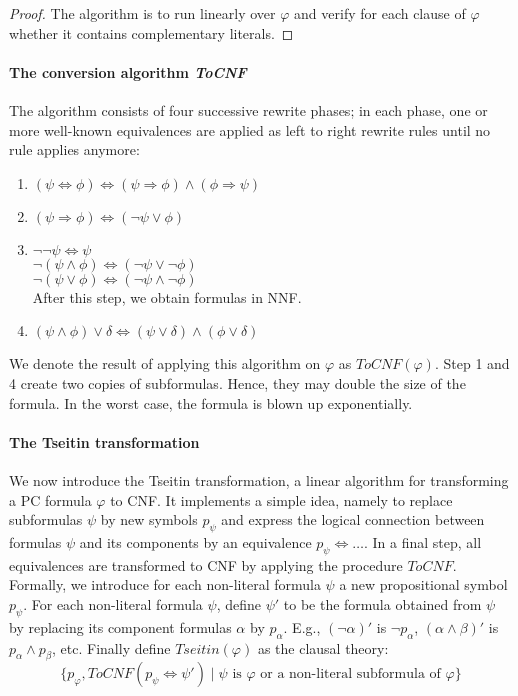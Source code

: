 \documentclass[10pt,a4paper]{article}
\theoremstyle{definition}
\let\iff\Leftrightarrow
\begin{document}
\begin{proof}
The algorithm is to run linearly over $\varphi$ and verify for each clause of $\varphi$ whether it contains complementary literals.
\end{proof}

\paragraph{The conversion algorithm \textit{ToCNF}} The algorithm consists of four successive rewrite phases; in each phase, one or more well-known equivalences are applied as left to right rewrite rules until no rule applies anymore:

\begin{enumerate}
	\item $(\psi \iff \phi) \iff (\psi \Rightarrow \phi) \land (\phi \Rightarrow \psi)$
	\item $(\psi \Rightarrow \phi) \iff (\lnot\psi\lor\phi)$
	\item $\lnot\lnot\psi\iff\psi$ \\
	$\lnot(\psi\land\phi)\iff(\lnot\psi\lor\lnot\phi)$ \\
	$\lnot(\psi\lor\phi)\iff(\lnot\psi\land\lnot\phi)$\\
	After this step, we obtain formulas in NNF.
	\item $(\psi\land\phi)\lor\delta\iff(\psi\lor\delta)\land(\phi\lor\delta)$
\end{enumerate}

We denote the result of applying this algorithm on $\varphi$ as $ToCNF(\varphi)$. Step 1 and 4 create two copies of subformulas. Hence, they may double the size of the formula. In the worst case, the formula is blown up exponentially.

\paragraph{The Tseitin transformation}

We now introduce the Tseitin transformation, a linear algorithm for transforming a PC formula $\varphi$ to CNF. It implements a simple idea, namely to replace subformulas $\psi$ by new symbols $p_\psi$ and express the logical connection between formulas $\psi$ and its components by an equivalence $p_\psi \iff \dots$. In a final step, all equivalences are transformed to CNF by applying the procedure $ToCNF$.\\

Formally, we introduce for each non-literal formula $\psi$ a new propositional symbol $p_\psi$. For each
non-literal formula $\psi$, define $\psi'$ to be the formula obtained from $\psi$ by replacing its component formulas $\alpha$ by $p_\alpha$. E.g., $(\lnot\alpha)'$ is $\lnot p_\alpha$, $(\alpha\land\beta)'$ is $p_\alpha \land p_\beta$, etc. Finally define $Tseitin(\varphi)$ as the
clausal theory: $$\{p_\varphi, ToCNF(p_\psi\iff\psi') \mid \psi \text{ is }\varphi \text{ or a non-literal subformula of }\varphi\}$$
\end{document}
